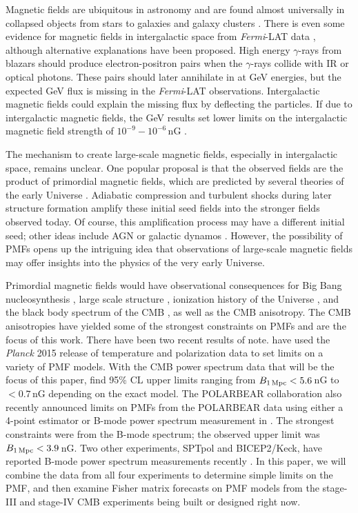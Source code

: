 \documentclass[preprint]{emulateapj}
\newcommand{\bpmf}{\ensuremath{B_{\rm 1\,Mpc}}}
\newcommand{\fermilat}{\textit{Fermi}-LAT}
\newcommand{\planck}{{\sl Planck}}
\newcommand{\bicepkeck}{BICEP2/Keck}
\newcommand{\pb}{POLARBEAR}
\newcommand{\sptpol}{SPTpol}
\begin{document}
Magnetic fields are ubiquitous in astronomy and are found almost universally in collapsed objects from stars to galaxies and galaxy clusters \citep[for review, see][]{ryu12, widrow12}. 
There is even some evidence for magnetic fields in intergalactic space from \fermilat{} data \citep{neronov10}, although alternative explanations \citep{broderick12} have been proposed. 
High energy $\gamma$-rays from blazars should  produce electron-positron pairs when the $\gamma$-rays collide with IR or optical photons. 
These pairs should later annihilate in at GeV energies, but the expected GeV flux is missing in the \fermilat{} observations. 
Intergalactic magnetic fields could explain the missing flux by deflecting the particles. 
If due to intergalactic magnetic fields, the GeV results set lower limits on the intergalactic magnetic field strength of $10^{-9} - 10^{-6}$\,nG \citep{tavecchio10,taylor11,dermer11,vovk12}. 

The mechanism to create large-scale magnetic fields, especially in intergalactic space, remains unclear. 
One popular proposal is that the observed fields are the product of primordial magnetic fields, which are predicted by several theories of the early Universe \citep[e.g.,][]{turner88, grasso98,ichiki06}. 
Adiabatic compression and turbulent shocks during later structure formation amplify these initial seed fields into the stronger fields observed today. 
Of course, this amplification process may have a different initial seed; other ideas include AGN or galactic dynamos \citep[for a review, see][]{giovannini04}. 
However, the possibility of PMFs opens up the intriguing idea that observations of large-scale magnetic fields may offer insights into the physics of the very early Universe. 


Primordial magnetic fields would have observational consequences for Big Bang nucleosynthesis \citep[e.g.,][]{kahniashvili10}, large scale structure \citep[e.g.,][]{battaner97}, ionization history of the Universe \citep{kunze15}, and the black body spectrum of the CMB \citep[e.g.,][]{kunze14},  as well as the CMB anisotropy. 
The CMB anisotropies have yielded some of the strongest constraints on PMFs and are the focus of this work.
There have been two recent results of note. 
\citet{planck15-19} have used the \planck{} 2015 release of temperature and polarization data to set limits on a variety of PMF models. 
With the CMB power spectrum data that will be the focus of this paper, \citet{planck15-19} find 95\% CL upper limits ranging from $\bpmf < 5.6$\,nG to $<0.7$\,nG depending on the exact model. 
The \pb{} collaboration also recently announced limits on PMFs from the \pb{} data using either a 4-point estimator or B-mode power spectrum measurement in \citep{polarbear14b}. 
The strongest constraints were from the B-mode spectrum; the observed upper limit was $\bpmf < 3.9$\,nG. 
Two other experiments, \sptpol{} and \bicepkeck{}, have reported B-mode power spectrum measurements recently \citep{keisler15,bicepkeck15}.
In this paper, we will combine the data from all four experiments to determine simple limits on the PMF, and then examine Fisher matrix forecasts on PMF models from the stage-III and stage-IV CMB experiments being built or designed right now. 
\end{document}
